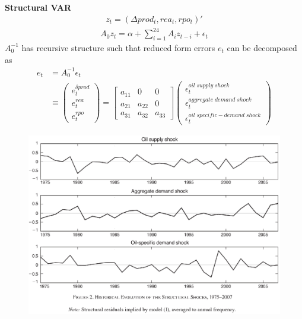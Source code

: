 \documentclass{beamer}
\begin{document}
\begin{frame}
  \textbf{Structural VAR}\\
  \begin{align}
  z_t=(\Delta prod_t, rea_t, rpo_t)'
\end{align}
\begin{align}
  A_0z_t = \alpha + \sum^{24}_{i=1}A_iz_{t-i}+\epsilon_t
\end{align}
\medskip
$A_0^{-1}$ has recursive structure such that reduced form errors $e_t$ can be decomposed as
\begin{align}
  e_t&= A^{-1}_0\epsilon_t\\ \nonumber
   &\equiv \begin{pmatrix} e_t^{\delta prod} \\ e_t^ {rea} \\ e_t^{rpo}  \end{pmatrix}
   = \begin{bmatrix}
     a_{11} & 0 & 0\\
     a_{21} & a_{22} & 0\\
     a_{31} & a_{32} & a_{33}
   \end{bmatrix}
   \begin{pmatrix}
     \epsilon_t^{oil\;supply\;shock} \\ \epsilon_t^{aggregate\;demand\;shock} \\ \epsilon_t^{oil\;specific-demand\;shock}
   \end{pmatrix}
\end{align}
\end{frame}

\begin{frame}
  \begin{figure}
    \includegraphics[scale=.7]{killian2.eps}
  \end{figure}
\end{frame}
\end{document}
